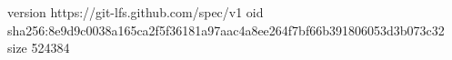 version https://git-lfs.github.com/spec/v1
oid sha256:8e9d9c0038a165ca2f5f36181a97aac4a8ee264f7bf66b391806053d3b073c32
size 524384
